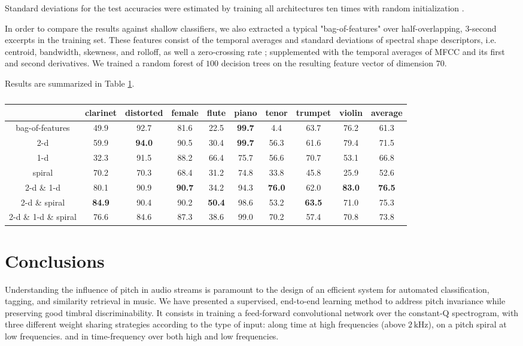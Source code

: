\documentclass{article}
\makeatletter
\newcommand*{\ie}{i.e.\@\xspace}
\makeatother
\begin{document}
Standard deviations for the test accuracies were estimated by training all architectures
ten times with random initialization \cite{He2015}.

In order to compare the results against shallow classifiers, we also extracted a typical
"bag-of-features" over half-overlapping, 3-second excerpts in the training set.
These features consist of the temporal averages and standard
deviations of spectral shape descriptors, \ie centroid, bandwidth, skewness,
and rolloff, as well a zero-crossing rate ;
supplemented with the temporal averages of MFCC and its first and second derivatives.
We trained a random forest of $100$ decision trees on the resulting feature vector
of dimension $70$.

Results are summarized in Table \ref{table:results}.

\begin{table}[t]
	\begin{center}
	\setlength{\unitlength}{1cm}
	\begin{tabular}{|c|cccccccc|c|}
		\hline
		& clarinet & distorted & female & flute & piano & tenor & trumpet & violin & average \\
		\hline
		bag-of-features
		& 49.9 & 92.7 & 81.6 & 22.5 & \textbf{99.7} & \hphantom{0}4.4 & 63.7 & 76.2 & 61.3 \\
		\hline
		
		2-d
		& 59.9 & \textbf{94.0} & 90.5 & 30.4 & \textbf{99.7} & 56.3 & 61.6 & 79.4 & 71.5 \\
		1-d
		& 32.3 & 91.5 & 88.2 & 66.4 & 75.7 & 56.6 & 70.7 & 53.1 & 66.8 \\
		spiral
		& 70.2 & 70.3 & 68.4 & 31.2 & 74.8 & 33.8 & 45.8 & 25.9 & 52.6 \\
		\hline
		2-d \& 1-d
		& 80.1 & 90.9 & \textbf{90.7} & 34.2 & 94.3 & \textbf{76.0} & 62.0 & \textbf{83.0} & \textbf{76.5} \\
		2-d \& spiral
		& \textbf{84.9} & 90.4 & 90.2 & \textbf{50.4} & 98.6 & 53.2 & \textbf{63.5} & 71.0 & 75.3\\
		\hline
		2-d \& 1-d \& spiral
		& 76.6 & 84.6 & 87.3 & 38.6 & 99.0 & 70.2 & 57.4 & 70.8 & 73.8  \\
		\hline
	\end{tabular}
	\end{center}
	\caption{\label{table:results}}
\end{table}


\section{Conclusions}
Understanding the influence of pitch in audio streams is paramount to the design of
an efficient system for automated classification, tagging, and similarity retrieval in music. 
We have presented a supervised, end-to-end learning method to address pitch invariance
while preserving good timbral discriminability.
It consists in training a feed-forward convolutional network over the constant-Q spectrogram,
with three different weight sharing strategies according to the type of input:
along time at high frequencies (above $2\,\mathrm{kHz}$), on a pitch spiral at low frequencies.
and in time-frequency over both high and low frequencies.
\end{document}
